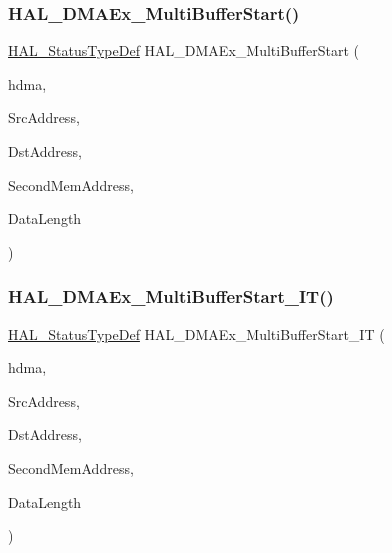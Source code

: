 \subsubsection{\texorpdfstring{H\+A\+L\+\_\+\+D\+M\+A\+Ex\+\_\+\+Multi\+Buffer\+Start()}{HAL\_DMAEx\_MultiBufferStart()}}
{\footnotesize\ttfamily \hyperlink{stm32f4xx__hal__def_8h_a63c0679d1cb8b8c684fbb0632743478f}{H\+A\+L\+\_\+\+Status\+Type\+Def} H\+A\+L\+\_\+\+D\+M\+A\+Ex\+\_\+\+Multi\+Buffer\+Start (\begin{DoxyParamCaption}\item[{\hyperlink{group___d_m_a___exported___types_ga41b754a906b86bce54dc79938970138b}{D\+M\+A\+\_\+\+Handle\+Type\+Def} $\ast$}]{hdma,  }\item[{uint32\+\_\+t}]{Src\+Address,  }\item[{uint32\+\_\+t}]{Dst\+Address,  }\item[{uint32\+\_\+t}]{Second\+Mem\+Address,  }\item[{uint32\+\_\+t}]{Data\+Length }\end{DoxyParamCaption})}

\mbox{\label{group___d_m_a_ex___exported___functions___group1_gaeffe492a7bbfa25291075b37eefc5152}} 
\subsubsection{\texorpdfstring{H\+A\+L\+\_\+\+D\+M\+A\+Ex\+\_\+\+Multi\+Buffer\+Start\+\_\+\+I\+T()}{HAL\_DMAEx\_MultiBufferStart\_IT()}}
{\footnotesize\ttfamily \hyperlink{stm32f4xx__hal__def_8h_a63c0679d1cb8b8c684fbb0632743478f}{H\+A\+L\+\_\+\+Status\+Type\+Def} H\+A\+L\+\_\+\+D\+M\+A\+Ex\+\_\+\+Multi\+Buffer\+Start\+\_\+\+IT (\begin{DoxyParamCaption}\item[{\hyperlink{group___d_m_a___exported___types_ga41b754a906b86bce54dc79938970138b}{D\+M\+A\+\_\+\+Handle\+Type\+Def} $\ast$}]{hdma,  }\item[{uint32\+\_\+t}]{Src\+Address,  }\item[{uint32\+\_\+t}]{Dst\+Address,  }\item[{uint32\+\_\+t}]{Second\+Mem\+Address,  }\item[{uint32\+\_\+t}]{Data\+Length }\end{DoxyParamCaption})}

